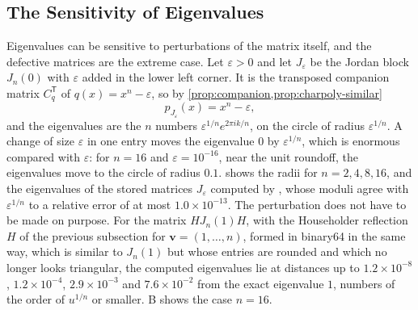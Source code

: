 \subsection{The Sensitivity of Eigenvalues}

Eigenvalues can be sensitive to perturbations of the matrix itself, and the defective matrices are the extreme case. Let $\varepsilon>0$ and let $J_\varepsilon$ be the Jordan block $J_n(0)$ with $\varepsilon$ added in the lower left corner. It is the transposed companion matrix $C_q^{\mathsf T}$ of $q(x)=x^n-\varepsilon$, so by \cref{prop:companion,prop:charpoly-similar}
\[
p_{J_\varepsilon}(x)=x^n-\varepsilon,
\]
and the eigenvalues are the $n$ numbers $\varepsilon^{1/n}e^{2\pi ik/n}$, on the circle of radius $\varepsilon^{1/n}$. A change of size $\varepsilon$ in one entry moves the eigenvalue $0$ by $\varepsilon^{1/n}$, which is enormous compared with $\varepsilon$: for $n=16$ and $\varepsilon=10^{-16}$, near the unit roundoff, the eigenvalues move to the circle of radius $0.1$.  shows the radii for $n=2,4,8,16$, and the eigenvalues of the stored matrices $J_\varepsilon$ computed by , whose moduli agree with $\varepsilon^{1/n}$ to a relative error of at most $1.0\times10^{-13}$. The perturbation does not have to be made on purpose. For the matrix $HJ_n(1)H$, with the Householder reflection $H$ of the previous subsection for $\mathbf v=(1,\ldots,n)$, formed in binary64 in the same way, which is similar to $J_n(1)$ but whose entries are rounded and which no longer looks triangular, the computed eigenvalues lie at distances up to $1.2\times10^{-8}$, $1.2\times10^{-4}$, $2.9\times10^{-3}$ and $7.6\times10^{-2}$ from the exact eigenvalue $1$, numbers of the order of $u^{1/n}$ or smaller. B shows the case $n=16$.

